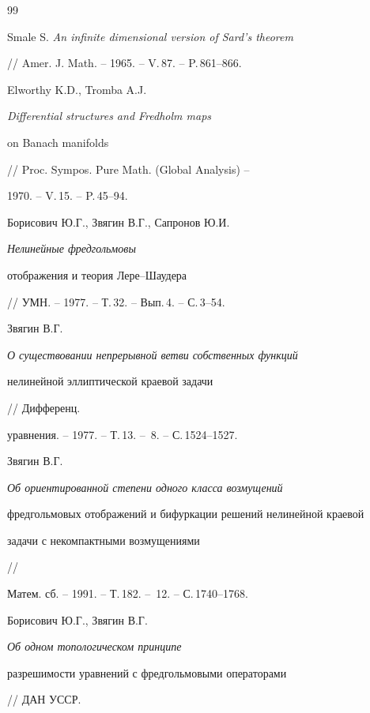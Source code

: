 \begin{thebibliography}{99}







Smale S. {\em An infinite dimensional version of Sard's theorem}


// Amer. J. Math. -- 1965. -- V.\,87. -- P.\,861--866.







Elworthy K.D., Tromba A.J. {\em Differential structures and Fredholm maps


on Banach manifolds} // Proc. Sympos. Pure Math. (Global Analysis) --


1970. -- V.\,15. -- P.\,45--94.







Борисович Ю.Г., Звягин В.Г., Сапронов Ю.И. {\em Нелинейные фредгольмовы 


отображения и теория Лере--Шаудера}


// УМН. -- 1977. -- Т.\,32. -- Вып.\,4. -- С.\,3--54.







Звягин В.Г. {\em О существовании непрерывной ветви собственных функций


нелинейной эллиптической краевой задачи} // Дифференц.


уравнения. -- 1977. -- Т.\,13. -- \No\,8. -- С.\,1524--1527.







Звягин В.Г. {\em Об ориентированной степени одного класса возмущений


фредгольмовых отображений и бифуркации решений нелинейной краевой


задачи с некомпактными возмущениями} //


Матем. сб. -- 1991. -- Т.\,182. -- \No\,12. -- С.\,1740--1768.







Борисович Ю.Г., Звягин В.Г. {\em Об одном топологическом принципе


разрешимости уравнений с фредгольмовыми операторами} // ДАН УССР.



\end{thebibliography}
